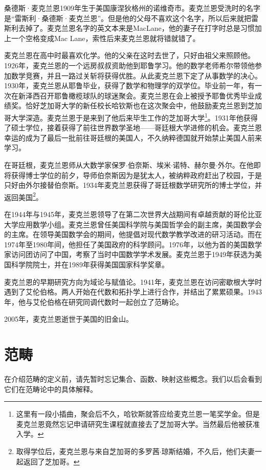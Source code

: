 \documentclass{article}
\begin{document}
桑德斯·麦克兰恩1909年生于美国康涅狄格州的诺维奇市。麦克兰恩受洗时的名字是“雷斯利·桑德斯·麦克兰恩”。但是他的父母不喜欢这个名字，所以后来就把雷斯利去掉了。麦克兰恩名字的英文本来是MacLane，他的妻子在打字时总是习惯加上一个空格变成Mac Lane，索性后来麦克兰恩就将错就错了。

麦克兰恩在高中时最喜欢化学。他的父亲在这时去世了，只好由祖父来照顾他。1926年，麦克兰恩的一个远房叔叔资助他到耶鲁学习。他的数学老师希尔带领他参加数学竞赛，并且一路过关斩将获得优胜。从此麦克兰恩下定了从事数学的决心。1930年，麦克兰恩从耶鲁毕业，获得了数学和物理学的双学位。毕业前一年，有一次在新泽西召开耶鲁橄榄球队的球迷聚会。麦克兰恩在会上被授予耶鲁优秀毕业成绩奖\cite{Wiki-Mac-Lane}。恰好芝加哥大学的新任校长哈钦斯也在这次聚会中，他鼓励麦克兰恩到芝加哥大学深造。麦克兰恩于是来到了他后来毕生工作的芝加哥大学\footnote{这里有一段小插曲，聚会后不久，哈钦斯就答应给麦克兰恩一笔奖学金。但是麦克兰恩竟然忘记申请研究生课程就直接去了芝加哥大学。当然最后他被获准入学。}。1931年他获得了硕士学位，接着获得了前往世界数学圣地——哥廷根大学进修的机会。麦克兰恩幸运的成为了最后一批前往哥廷根的美国人，不久纳粹德国就开始禁止美国人前来学习。

在哥廷根，麦克兰恩师从大数学家保罗$\cdot$伯奈斯、埃米$\cdot$诺特、赫尔曼$\cdot$外尔。在他即将获得博士学位的前夕，导师伯奈斯因为是犹太人，被纳粹政府赶出了校园，于是只好由外尔接替伯奈斯。1934年麦克兰恩获得了哥廷根数学研究所的博士学位，并返回美国\footnote{取得学位后，麦克兰恩与来自芝加哥的多罗茜$\cdot$琼斯结婚，不久后，他们夫妻一起返回了芝加哥。}。

在1944年与1945年，麦克兰恩领导了在第二次世界大战期间有卓越贡献的哥伦比亚大学应用数学小组。麦克兰恩曾任美国科学院与美国哲学会的副主席，美国数学会的主席。在领导美国数学会的期间，他提倡对现代数学教学改进的研习活动。而在1974年至1980年间，他担任了美国政府的科学顾问。1976年，以他为首的美国数学家访问团访问了中国，考察了当时中国数学学术发展。麦克兰恩于1949年获选为美国科学院院士，并在1989年获得美国国家科学奖章。

麦克兰恩的早期研究方向为域论与赋值论。1941年，麦克兰恩在访问密歇根大学时遇到了艾伦伯格。两人开始在代数和拓扑学上进行合作，并结出了累累硕果。1943年，他与艾伦伯格在研究同调代数时一起创立了范畴论。

2005年，麦克兰恩逝世于美国的旧金山。

\section{范畴}

在介绍范畴的定义前，请先暂时忘记集合、函数、映射这些概念。我们以后会看到它们在范畴论中的具体解释。
\end{document}
